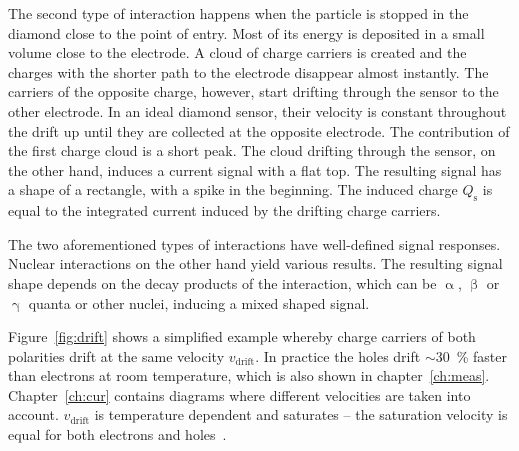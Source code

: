 The second type of interaction happens when the particle is stopped in the diamond close to the point of entry. Most of its energy is deposited in a small volume close to the electrode. A cloud of charge carriers is created and the charges with the shorter path to the electrode disappear almost instantly. The carriers of the opposite charge, however, start drifting through the sensor to the other electrode. In an ideal diamond sensor, their velocity is constant throughout the drift up until they are collected at the opposite electrode. The contribution of the first charge cloud is a short peak. The cloud drifting through the sensor, on the other hand, induces a current signal with a flat top. The resulting signal has a shape of a rectangle, with a spike in the beginning. %
The induced charge $Q_\mathrm{s}$ is equal to the integrated current induced by the drifting charge carriers.

The two aforementioned types of interactions have well-defined signal responses. Nuclear interactions on the other hand yield various results. The resulting signal shape depends on the decay products of the interaction, which can be $\upalpha$, $\upbeta$ or $\upgamma$ quanta or other nuclei, inducing a mixed shaped signal. 

Figure~\ref{fig:drift} shows a simplified example whereby charge carriers of both polarities drift at the same velocity $v_\mathrm{drift}$. In practice the holes drift $\sim30$~\% faster than electrons at room temperature, which is also shown in chapter~\ref{ch:meas}. Chapter~\ref{ch:cur} contains diagrams where different velocities are taken into account. $v_\mathrm{drift}$ is temperature dependent and saturates -- the saturation velocity is equal for both electrons and holes~\cite{Jansen:1956431}. 


